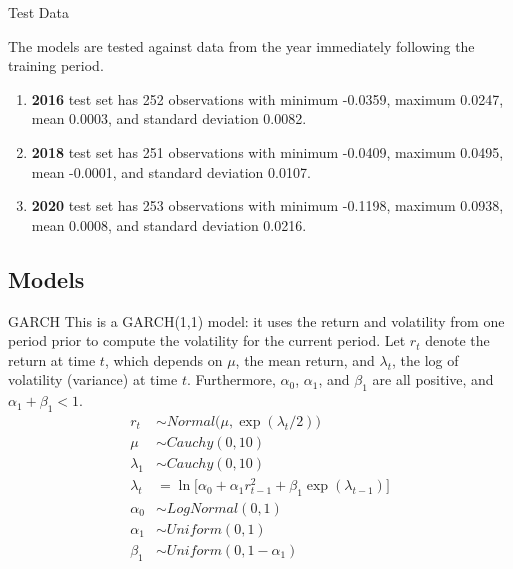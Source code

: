 \documentclass[11pt]{beamer}
\begin{document}
\begin{frame}{Test Data}

The models are tested against data from the year immediately following the training period.

\begin{enumerate}
\item \textbf{2016} test set has 252 observations with minimum -0.0359, maximum 0.0247, mean 0.0003, and standard deviation 0.0082. 
\item \textbf{2018} test set has 251 observations with minimum -0.0409, maximum 0.0495, mean -0.0001, and standard deviation 0.0107. 
\item \textbf{2020} test set has 253 observations with minimum -0.1198, maximum 0.0938, mean 0.0008, and standard deviation 0.0216.


\end{enumerate}  

\end{frame}

\subsection{Models}

\begin{frame}{GARCH}
This is a GARCH(1,1) model: it uses the return and volatility from one period prior to compute the volatility for the current period. Let $r_t$ denote the return at time $t$, which depends on $\mu$, the mean return, and $\lambda_t$, the log of volatility (variance) at time $t$. Furthermore, $\alpha_0$, $\alpha_1$, and $\beta_1$ are all positive, and $\alpha_1 + \beta_1 < 1$.  
\begin{align}
r_t &\sim Normal\bigl(\mu, \exp(\lambda_t/2)\bigr) \\
\mu &\sim Cauchy(0, 10) \\
\lambda_1 &\sim Cauchy(0,10) \\
\lambda_t &= \ln\bigl[\alpha_0 + \alpha_1 r_{t-1}^2 + \beta_1 \exp(\lambda_{t-1})\bigr] \\
\alpha_0  &\sim LogNormal(0,1) \\
\alpha_1 &\sim Uniform(0,1) \\
\beta_1 &\sim Uniform(0, 1 - \alpha_1)
\end{align}
\end{frame}
\end{document}
